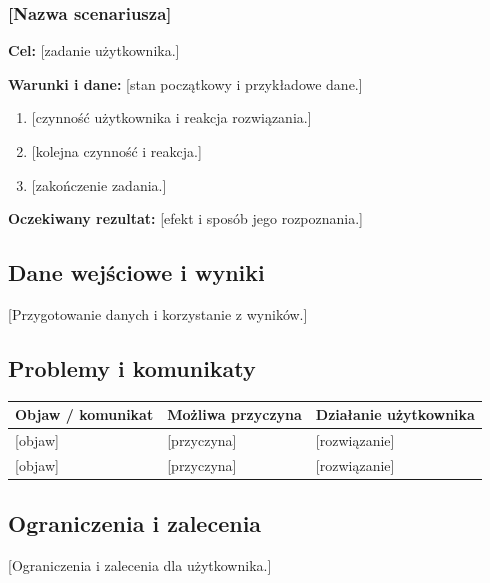 \documentclass[11pt,a4paper,oneside]{article}
\newif\ifpodpowiedzi
\newcommand{\podpowiedz}[1]{\ifpodpowiedzi\par\begingroup\small\color{hintcolor}\textit{Wskazówka: #1}\par\endgroup\fi}
\newcommand{\pole}[1]{\textnormal{[#1]}}
\begin{document}
\subsubsection{\pole{Nazwa scenariusza}}
\textbf{Cel:} \pole{zadanie użytkownika.}\par
\textbf{Warunki i dane:} \pole{stan początkowy i przykładowe dane.}
\begin{enumerate}
\item \pole{czynność użytkownika i reakcja rozwiązania.}
\item \pole{kolejna czynność i reakcja.}
\item \pole{zakończenie zadania.}
\end{enumerate}
\textbf{Oczekiwany rezultat:} \pole{efekt i sposób jego rozpoznania.}

\subsection{Dane wejściowe i wyniki}
\podpowiedz{Jeśli dotyczy: opisz obsługiwane formaty, wymagane pola, dopuszczalne wartości i ograniczenia danych. Wyjaśnij zapis, eksport, odtwarzanie lub interpretację wyników. Wskaż czynności mogące nadpisać lub usunąć dane. Dla animacji możesz opisać formaty plików wynikowych i parametry odtwarzania.}
\pole{Przygotowanie danych i korzystanie z wyników.}

\subsection{Problemy i komunikaty}
\podpowiedz{Opisz typowe problemy z perspektywy użytkownika: jak je rozpoznać, co oznaczają i jakie działania podjąć. Podaj rzeczywiste komunikaty, jeśli występują. Dodaj wiersze według potrzeb.}
\begin{tabularx}{\textwidth}{@{}Y Y Y@{}}
\toprule
Objaw / komunikat & Możliwa przyczyna & Działanie użytkownika\\
\midrule
\pole{objaw} & \pole{przyczyna} & \pole{rozwiązanie}\\
\pole{objaw} & \pole{przyczyna} & \pole{rozwiązanie}\\
\bottomrule
\end{tabularx}

\subsection{Ograniczenia i zalecenia}
\podpowiedz{Wskaż ograniczenia mające wpływ na korzystanie z projektu oraz praktyczne zalecenia. Jeśli użytkownik korzysta z funkcji AI, wyjaśnij charakter wyników, ich ograniczenia i potrzebę weryfikacji tam, gdzie ma to znaczenie. Nie dodawaj informacji o AI, jeśli nie jest częścią rozwiązania i nie wpływa na użytkowanie.}
\pole{Ograniczenia i zalecenia dla użytkownika.}
\end{document}
